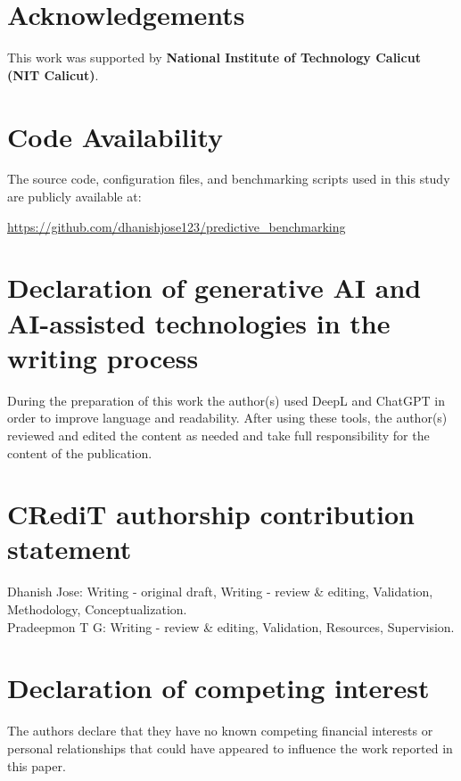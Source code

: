 ﻿\documentclass[12pt]{article}
\begin{document}
	\section*{Acknowledgements}
	This work was supported by \textbf{National Institute of Technology Calicut (NIT Calicut)}.
	
	\section*{Code Availability}
	The source code, configuration files, and benchmarking scripts used in this study are publicly available at:
	
	\url{https://github.com/dhanishjose123/predictive_benchmarking}
	
	\section*{Declaration of generative AI and AI-assisted technologies in the writing process}
	During the preparation of this work the author(s) used DeepL and ChatGPT in order to improve language and readability. After using these tools, the author(s) reviewed and edited the content as needed and take full responsibility for the content of the publication.
	
	\appendix
	

	
	
	\section*{CRediT authorship contribution statement}
Dhanish Jose: Writing - original draft, Writing - review \& editing, Validation, Methodology, Conceptualization.\\
Pradeepmon T G: Writing - review \& editing, Validation, Resources, Supervision.

\section*{Declaration of competing interest}
The authors declare that they have no known competing financial interests or personal relationships that could have appeared to influence the work reported in this paper.


	
\end{document}
